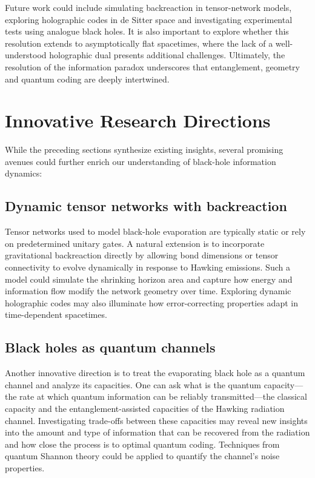 \documentclass[12pt]{article}
\begin{document}
Future work could include simulating backreaction in tensor-network models, exploring holographic codes in de Sitter space and investigating experimental tests using analogue black holes.  It is also important to explore whether this resolution extends to asymptotically flat spacetimes, where the lack of a well-understood holographic dual presents additional challenges.  Ultimately, the resolution of the information paradox underscores that entanglement, geometry and quantum coding are deeply intertwined.

\section{Innovative Research Directions}
While the preceding sections synthesize existing insights, several promising avenues could further enrich our understanding of black-hole information dynamics:

\subsection{Dynamic tensor networks with backreaction}
Tensor networks used to model black-hole evaporation are typically static or rely on predetermined unitary gates.  A natural extension is to incorporate gravitational backreaction directly by allowing bond dimensions or tensor connectivity to evolve dynamically in response to Hawking emissions.  Such a model could simulate the shrinking horizon area and capture how energy and information flow modify the network geometry over time.  Exploring dynamic holographic codes may also illuminate how error-correcting properties adapt in time-dependent spacetimes.

\subsection{Black holes as quantum channels}
Another innovative direction is to treat the evaporating black hole as a quantum channel and analyze its capacities.  One can ask what is the quantum capacity—the rate at which quantum information can be reliably transmitted—the classical capacity and the entanglement-assisted capacities of the Hawking radiation channel.  Investigating trade-offs between these capacities may reveal new insights into the amount and type of information that can be recovered from the radiation and how close the process is to optimal quantum coding.  Techniques from quantum Shannon theory could be applied to quantify the channel’s noise properties.
\end{document}
